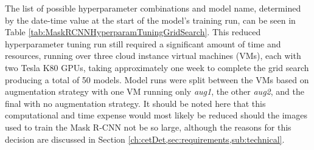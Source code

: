 The list of possible hyperparameter combinations and model name, determined by the date-time value at the start of the model's training run, can be seen in Table \ref{tab:MaskRCNNHyperparamTuningGridSearch}. This reduced hyperparameter tuning run still required a significant amount of time and resources, running over three cloud instance virtual machines (VMs), each with two Tesla K80 GPUs, taking approximately one week to complete the grid search producing a total of 50 models. Model runs were split between the VMs based on augmentation strategy with one VM running only \textit{aug1}, the other \textit{aug2}, and the final with no augmentation strategy. It should be noted here that this computational and time expense would most likely be reduced should the images used to train the Mask R-CNN not be so large, although the reasons for this decision are discussed in Section \ref{ch:cetDet,sec:requirements,sub:technical}.


